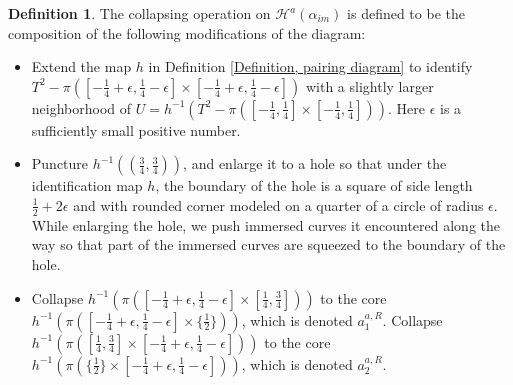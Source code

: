\documentclass{amsart}
\theoremstyle{definition}
\newtheorem{defn}[thm]{Definition}
\theoremstyle{remark}
\numberwithin{equation}{section}
\numberwithin{equation}{section} \makeatletter
\begin{document}
\begin{defn}\label{Definition, collapsing operation}
The collapsing operation on $\mathcal{H}^a(\alpha_{im})$ is defined to be the composition of the following modifications of the diagram: 
\begin{itemize}
\item[(Step 1)]Extend the map $h$ in Definition \ref{Definition, pairing diagram} to identify $T^2-\pi([-\frac{1}{4}+\epsilon,\frac{1}{4}-\epsilon]\times [-\frac{1}{4}+\epsilon,\frac{1}{4}-\epsilon])$ with a slightly larger neighborhood of $U=h^{-1}(T^2-\pi([-\frac{1}{4},\frac{1}{4}]\times [-\frac{1}{4},\frac{1}{4}]))$. Here $\epsilon$ is a sufficiently small positive number.  
\item[(Step 2)]Puncture $h^{-1}((\frac{3}{4},\frac{3}{4}))$, and enlarge it to a hole so that under the identification map $h$, the boundary of the hole is a square of side length $\frac{1}{2}+2\epsilon$ and with rounded corner modeled on a quarter of a circle of radius $\epsilon$.
While enlarging the hole, we push immersed curves it encountered along the way so that part of the immersed curves are squeezed to the boundary of the hole. 
\item[(Step 3)]Collapse $h^{-1}(\pi([-\frac{1}{4}+\epsilon,\frac{1}{4}-\epsilon]\times [\frac{1}{4},\frac{3}{4}]))$ to the core $h^{-1}(\pi([-\frac{1}{4}+\epsilon,\frac{1}{4}-\epsilon]\times\{\frac{1}{2}\}))$, which is denoted $a^{a,R}_1$. Collapse $h^{-1}(\pi([\frac{1}{4},\frac{3}{4}]\times[-\frac{1}{4}+\epsilon,\frac{1}{4}-\epsilon]))$ to the core $h^{-1}(\pi(\{\frac{1}{2}\}\times[-\frac{1}{4}+\epsilon,\frac{1}{4}-\epsilon]))$, which is denoted $a^{a,R}_2$. 
\end{itemize}
\end{defn}  
\end{document}
